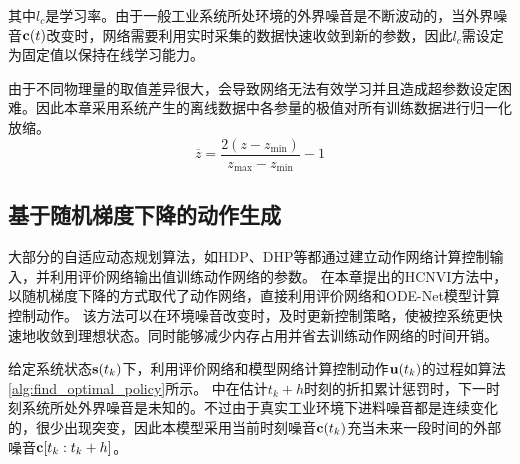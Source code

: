 其中$l_c$是学习率。由于一般工业系统所处环境的外界噪音是不断波动的，当外界噪音$\mathbf
c(t)$改变时，网络需要利用实时采集的数据快速收敛到新的参数，因此$l_c$需设定为固定值以保持在线学习能力。

由于不同物理量的取值差异很大，会导致网络无法有效学习并且造成超参数设定困难。因此本章采用系统产生的离线数据中各参量的极值对所有训练数据进行归一化放缩。
\begin{equation}
\label{equ:normalize} \overline{z}=\frac{2\left(z-z_{\min
}\right)}{z_{\max }-z_{\min }}-1
\end{equation}

\subsection{基于随机梯度下降的动作生成}
大部分的自适应动态规划算法，如HDP、DHP\cite{Werbos2008}等都通过建立动作网络计算控制输入，并利用评价网络输出值训练动作网络的参数。
在本章提出的HCNVI方法中，以随机梯度下降的方式取代了动作网络，直接利用评价网络和ODE-Net模型计算控制动作。
该方法可以在环境噪音改变时，及时更新控制策略，使被控系统更快速地收敛到理想状态。同时能够减少内存占用并省去训练动作网络的时间开销。

给定系统状态$\mathbf s(t_k)$下，利用评价网络和模型网络计算控制动作${\mathbf
u}(t_k)$的过程如算法\ref{alg:find_optimal_policy}所示。
中在估计$t_{k}+h$时刻的折扣累计惩罚时，下一时刻系统所处外界噪音是未知的。不过由于真实工业环境下进料噪音都是连续变化的，很少出现突变，因此本模型采用当前时刻噪音$\mathbf
c(t_k)$充当未来一段时间的外部噪音$\mathbf c[t_k:t_k+h]$。

